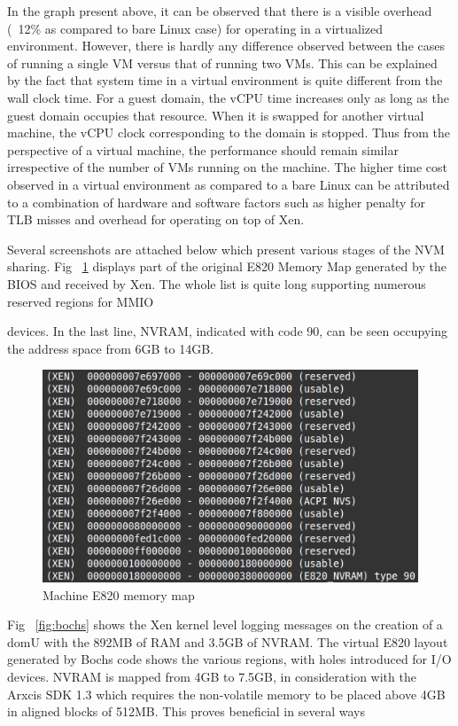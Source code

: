 In the graph present above, it can be observed that there is a visible overhead (~12\% as compared to bare Linux case) for operating in a virtualized environment. However, there is hardly any difference observed between the cases of running a single VM versus that of running two VMs. This can be explained by the fact that system time in a virtual environment is quite different from the wall clock time. For a guest domain, the vCPU time increases only as long as the guest domain occupies that resource. When it is swapped for another virtual machine, the vCPU clock corresponding to the domain is stopped. Thus from the perspective of a virtual machine, the performance should remain similar irrespective of the number of VMs running on the machine. The higher time cost observed in a virtual environment as compared to a bare Linux can be attributed to a combination of hardware and software factors such as higher penalty for TLB misses and overhead for operating on top of Xen.

Several screenshots are attached below which present various stages of the NVM sharing. Fig ~\ref{fig:xen_boot} displays part of the original E820 Memory Map generated by the BIOS and received by Xen. The whole list is quite long supporting numerous reserved regions for MMIO

devices. In the last line, NVRAM, indicated with code 90, can be seen occupying the address space from 6GB to 14GB. 

\begin{figure}[H]
\centering
\includegraphics{figures/xen_e820.png}
\caption{Machine E820 memory map}
\label{fig:xen_boot}
\end{figure}

Fig ~\ref{fig:bochs} shows the Xen kernel level logging messages on the creation of a domU with the 892MB of RAM and 3.5GB of NVRAM. The virtual E820 layout generated by Bochs code shows the various regions, with holes introduced for I/O devices. NVRAM is mapped from 4GB to 7.5GB, in consideration with the Arxcis SDK 1.3 which requires the non-volatile memory to be placed above 4GB in aligned blocks of 512MB. This proves beneficial in several ways

